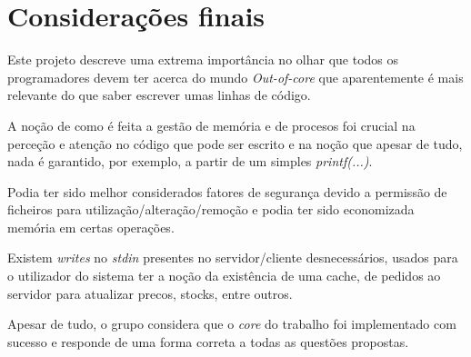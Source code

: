 \documentclass[a4paper,11pt]{report}
\begin{document}
\chapter{Considerações finais}

\hspace{0.50cm} Este projeto descreve uma extrema importância no olhar que todos os programadores devem ter acerca do mundo \textit{Out-of-core} que aparentemente é mais relevante do que saber escrever umas linhas de código. \par

A noção de como é feita a gestão de memória e de procesos foi crucial na perceção e atenção no código que pode ser escrito e na noção que apesar de tudo, nada é garantido, por exemplo, a partir de um simples \textit{printf(...)}.

Podia ter sido melhor considerados fatores de segurança devido a permissão de ficheiros para utilização/alteração/remoção e podia ter sido economizada memória em certas operações.

Existem \textit{writes} no \textit{stdin} presentes no servidor/cliente desnecessários, usados para o utilizador do sistema ter a noção da existência de uma cache, de pedidos ao servidor para atualizar precos, stocks, entre outros.

Apesar de tudo, o grupo considera que o \textit{core} do trabalho foi implementado com sucesso e responde de uma forma correta a todas as questões propostas.
\end{document}
